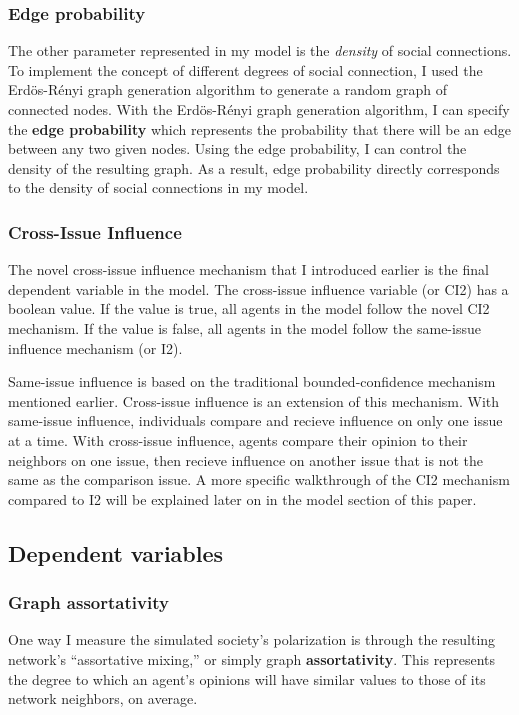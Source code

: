 \subsubsection{Edge probability}

The other parameter represented in my model is the \textit{density} of social
connections. To implement the concept of different degrees of social
connection, I used the Erd\"{o}s-R\'{e}nyi graph generation algorithm to
generate a random graph of connected nodes. With the Erd\"{o}s-R\'{e}nyi graph
generation algorithm, I can specify the \textbf{edge probability} which represents the
probability that there will be an edge between any two given nodes. Using the
edge probability, I can control the density of the resulting graph. As a
result, edge probability directly corresponds to the density of social
connections in my model.    

\subsubsection{Cross-Issue Influence}
The novel cross-issue influence mechanism that I introduced earlier is the final dependent variable in the model. The cross-issue influence variable (or CI2) has a boolean value. If the value is true, all agents in the model follow the novel CI2 mechanism. If the value is false, all agents in the model follow the same-issue influence mechanism (or I2).

Same-issue influence is based on the traditional bounded-confidence mechanism mentioned earlier. Cross-issue influence is an extension of this mechanism. With same-issue influence, individuals compare and recieve influence on only one issue at a time. With cross-issue influence, agents compare their opinion to their neighbors on one issue, then recieve influence on another issue that is not the same as the comparison issue. A more specific walkthrough of the CI2 mechanism compared to I2 will be explained later on in the model section of this paper. 

\subsection{Dependent variables}

\subsubsection{Graph assortativity}

One way I measure the simulated society's polarization is through the
resulting network's ``assortative mixing,'' or simply graph
\textbf{assortativity}. This represents the degree to which an agent's opinions
will have similar values to those of its network neighbors, on average.

